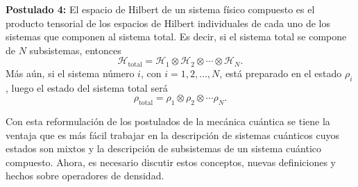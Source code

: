 \textbf{Postulado 4:} El espacio de Hilbert de un sistema físico compuesto es el producto tensorial de los espacios de Hilbert individuales de cada uno de los sistemas que componen al sistema total. Es decir, si el sistema total se compone de $N$ subsistemas, entonces \begin{equation}\label{Htotal4postulado}
	\mathcal{H}_{\text{total}}=\mathcal{H}_1\otimes \mathcal{H}_2\otimes \cdots \otimes \mathcal{H}_N.
\end{equation}
  Más aún, si el sistema número $i$, con $i=1,2,\ldots,N$, está preparado en el estado $\rho_i$, luego el estado del sistema total será  \begin{equation}\label{rhototal4postulado}
	\rho_{\text{total}}=\rho_1\otimes \rho_2 \otimes \cdots \rho_N.
\end{equation}


\setlength{\leftskip}{0pt}

Con esta reformulación de los postulados de la mecánica cuántica se tiene la
ventaja que es más fácil trabajar en la descripción de sistemas cuánticos cuyos estados son mixtos y la descripción de subsistemas de un sistema cuántico compuesto. Ahora, es necesario discutir estos conceptos, nuevas definiciones y hechos sobre operadores de densidad. 

